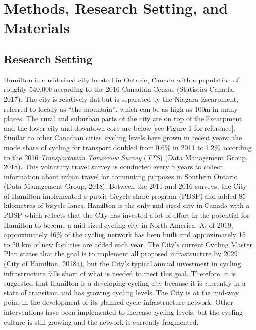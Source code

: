 \documentclass[]{elsarticle} %
\begin{document}
\hypertarget{sec:methods}{%
\section{Methods, Research Setting, and Materials}\label{sec:methods}}

\hypertarget{research-setting}{%
\subsection{Research Setting}\label{research-setting}}

Hamilton is a mid-sized city located in Ontario, Canada with a
population of roughly 540,000 according to the 2016 Canadian Census
(Statistics Canada, 2017). The city is relatively flat but is separated
by the Niagara Escarpment, referred to locally as ``the mountain'',
which can be as high as 100m in many places. The rural and suburban
parts of the city are on top of the Escarpment and the lower city and
downtown core are below {[}see Figure 1 for reference{]}. Similar to
other Canadian cities, cycling levels have grown in recent years; the
mode share of cycling for transport doubled from 0.6\% in 2011 to 1.2\%
according to the 2016 \emph{Transportation Tomorrow Survey} (\emph{TTS})
(Data Management Group, 2018). This voluntary travel survey is conducted
every 5 years to collect information about urban travel for commuting
purposes in Southern Ontario (Data Management Group, 2018). Between the
2011 and 2016 surveys, the City of Hamilton implemented a public bicycle
share program (PBSP) and added 85 kilometres of bicycle lanes. Hamilton
is the only mid-sized city in Canada with a PBSP which reflects that the
City has invested a lot of effort in the potential for Hamilton to
become a mid-sized cycling city in North America. As of 2019,
approximately 46\% of the cycling network has been built and
approximately 15 to 20 km of new facilities are added each year. The
City's current Cycling Master Plan states that the goal is to implement
all proposed infrastructure by 2029 (City of Hamilton, 2018a), but the
City's typical annual investment in cycling infrastructure falls short
of what is needed to meet this goal. Therefore, it is suggested that
Hamilton is a developing cycling city because it is currently in a state
of transition and has growing cycling levels. The City is at the mid-way
point in the development of its planned cycle infrastructure network.
Other interventions have been implemented to increase cycling levels,
but the cycling culture is still growing and the network is currently
fragmented.
\end{document}
